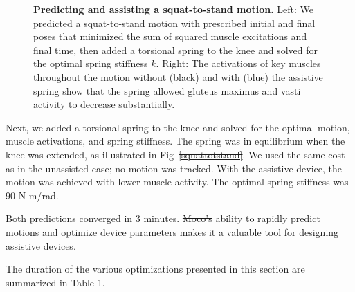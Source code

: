 \documentclass[10pt,letterpaper]{article}
\providecommand{\DIFaddtex}[1]{{\protect\color{blue}\uwave{#1}}} %
\providecommand{\DIFdeltex}[1]{{\protect\color{red}\sout{#1}}}                      %
\providecommand{\DIFaddbegin}{} %
\providecommand{\DIFaddend}{} %
\providecommand{\DIFdelbegin}{} %
\providecommand{\DIFdelend}{} %
\providecommand{\DIFaddbeginFL}{} %
\providecommand{\DIFaddendFL}{} %
\providecommand{\DIFdelbeginFL}{} %
\providecommand{\DIFdelendFL}{} %
\providecommand{\DIFadd}[1]{\texorpdfstring{\DIFaddtex{#1}}{#1}} %
\providecommand{\DIFdel}[1]{\texorpdfstring{\DIFdeltex{#1}}{}} %
\newcommand{\DIFscaledelfig}{0.5}
\newlength{\DIFdelgraphicswidth} %
\newlength{\DIFdelgraphicsheight} %
\newcommand{\DIFaddincludegraphics}[2][]{{\color{blue}\fbox{\DIFOincludegraphics[#1]{#2}}}} %
\newcommand{\DIFdelincludegraphics}[2][]{%
\sbox{\DIFdelgraphicsbox}{\DIFOincludegraphics[#1]{#2}}%
\settoboxwidth{\DIFdelgraphicswidth}{\DIFdelgraphicsbox} %
\settoboxtotalheight{\DIFdelgraphicsheight}{\DIFdelgraphicsbox} %
\scalebox{\DIFscaledelfig}{%
\parbox[b]{\DIFdelgraphicswidth}{\usebox{\DIFdelgraphicsbox}\\[-\baselineskip] \rule{\DIFdelgraphicswidth}{0em}}\llap{\resizebox{\DIFdelgraphicswidth}{\DIFdelgraphicsheight}{%
\setlength{\unitlength}{\DIFdelgraphicswidth}%
\begin{picture}(1,1)%
\thicklines\linethickness{2pt} %
{\color[rgb]{1,0,0}\put(0,0){\framebox(1,1){}}}%
{\color[rgb]{1,0,0}\put(0,0){\line( 1,1){1}}}%
{\color[rgb]{1,0,0}\put(0,1){\line(1,-1){1}}}%
\end{picture}%
}\hspace*{3pt}}} %
} %
\DeclareRobustCommand{\DIFaddbegin}{\DIFOaddbegin \let\includegraphics\DIFaddincludegraphics} %
\DeclareRobustCommand{\DIFaddend}{\DIFOaddend \let\includegraphics\DIFOincludegraphics} %
\DeclareRobustCommand{\DIFdelbegin}{\DIFOdelbegin \let\includegraphics\DIFdelincludegraphics} %
\DeclareRobustCommand{\DIFdelend}{\DIFOaddend \let\includegraphics\DIFOincludegraphics} %
\DeclareRobustCommand{\DIFaddbeginFL}{\DIFOaddbeginFL \let\includegraphics\DIFaddincludegraphics} %
\DeclareRobustCommand{\DIFaddendFL}{\DIFOaddendFL \let\includegraphics\DIFOincludegraphics} %
\DeclareRobustCommand{\DIFdelbeginFL}{\DIFOdelbeginFL \let\includegraphics\DIFdelincludegraphics} %
\DeclareRobustCommand{\DIFdelendFL}{\DIFOaddendFL \let\includegraphics\DIFOincludegraphics} %
\begin{document}
\begin{figure}[!h]
        \centering
        \caption{{\bf Predicting and assisting a squat-to-stand motion.}
            Left: We predicted a squat-to-stand motion with prescribed initial and final poses that minimized the sum of squared muscle excitations and final time, then added a torsional spring to the knee and solved for the optimal spring stiffness $k$. Right: The activations of key muscles throughout the motion without (black) and with (blue) the assistive spring show that the spring allowed gluteus maximus and vasti activity to decrease substantially.
        }
        \DIFdelbeginFL %
\DIFdelendFL \DIFaddbeginFL \label{squattostand}
    \DIFaddendFL %
\end{figure}

Next, we added a torsional spring to the knee and solved for the optimal motion, muscle activations, and spring stiffness. The spring was in equilibrium when the knee was extended, as illustrated in Fig~\DIFdelbegin \DIFdel{\ref{squattotstand}}\DIFdelend \DIFaddbegin \DIFadd{\ref{squattostand}}\DIFaddend . We used the same cost as in the unassisted case; no motion was tracked. With the assistive device, the motion was achieved with lower muscle activity. The optimal spring stiffness was 90 N-m/rad.

Both predictions converged in 3 minutes. \DIFdelbegin \DIFdel{Moco's }\DIFdelend \DIFaddbegin \DIFadd{The }\DIFaddend ability to rapidly predict motions and optimize device parameters makes \DIFdelbegin \DIFdel{it }\DIFdelend \DIFaddbegin \DIFadd{Moco }\DIFaddend a valuable tool for designing assistive devices.

The duration of the various optimizations presented in this section are summarized in Table 1.
\end{document}
